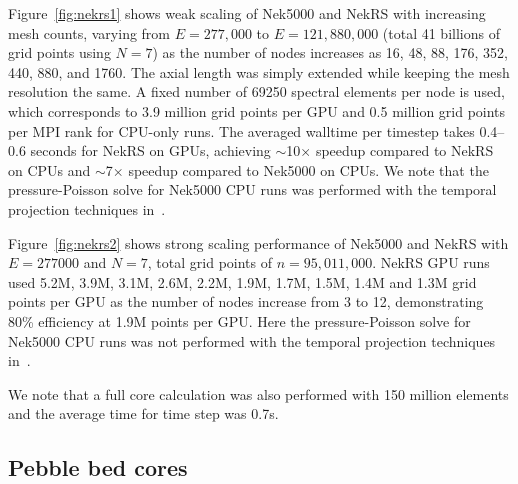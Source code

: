 \documentclass{anstrans}
\begin{document}
\medskip
Figure~\ref{fig:nekrs1} shows weak scaling of Nek5000 and NekRS with increasing mesh counts,
varying from $E = 277,000$ to $E = 121,880,000$ (total 41 billions of grid points using $N = 7$) 
as the number of nodes increases as 16, 48, 88, 176, 352, 440, 880, and 1760. 
The axial length was simply extended while keeping the mesh resolution the same. 
A fixed number of 69250 spectral elements per node is used, which corresponds 
to 3.9 million grid points per GPU and 0.5 million grid points per MPI rank for CPU-only runs.
The averaged walltime per timestep takes 0.4--0.6 seconds for NekRS on GPUs,
achieving $\sim$10$\times$ speedup compared to NekRS on CPUs and 
$\sim$7$\times$ speedup compared to Nek5000 on CPUs. 
We note that the pressure-Poisson solve for Nek5000 CPU runs was performed with the temporal 
projection techniques in~\cite{Fischer1998}.

\medskip
Figure~\ref{fig:nekrs2} shows strong scaling performance of Nek5000 and NekRS with $E = 277000$ 
and $N = 7$, total grid points of $n = 95,011,000$. NekRS GPU runs used 5.2M, 3.9M, 3.1M, 2.6M, 
2.2M, 1.9M, 1.7M, 1.5M, 1.4M and 1.3M grid points per GPU as the number of nodes increase 
from 3 to 12, demonstrating 80\% efficiency at 1.9M points per GPU.
Here the pressure-Poisson solve for Nek5000 CPU runs was not performed with the temporal projection 
techniques in~\cite{Fischer1998}.

\medskip
We note that a full core calculation was also performed with 150 million elements and the average 
time for time step was 0.7s.



\subsection{Pebble bed cores}
\end{document}
